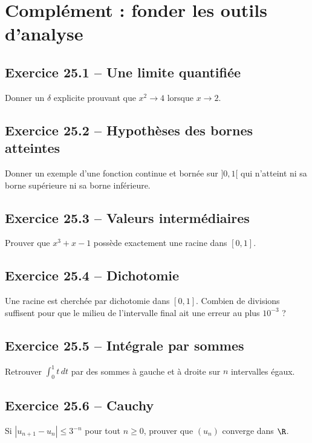 \chapter{Complément : fonder les outils d'analyse}
\section*{Exercice 25.1 -- Une limite quantifiée}
Donner un $\delta$ explicite prouvant que $x^2\to4$ lorsque $x\to2$.

\section*{Exercice 25.2 -- Hypothèses des bornes atteintes}
Donner un exemple d'une fonction continue et bornée sur $]0,1[$ qui n'atteint ni sa borne supérieure ni sa borne inférieure.

\section*{Exercice 25.3 -- Valeurs intermédiaires}
Prouver que $x^3+x-1$ possède exactement une racine dans $[0,1]$.

\section*{Exercice 25.4 -- Dichotomie}
Une racine est cherchée par dichotomie dans $[0,1]$. Combien de divisions suffisent pour que le milieu de l'intervalle final ait une erreur au plus $10^{-3}$ ?

\section*{Exercice 25.5 -- Intégrale par sommes}
Retrouver $\int_0^1t\,dt$ par des sommes à gauche et à droite sur $n$ intervalles égaux.

\section*{Exercice 25.6 -- Cauchy}
Si $|u_{n+1}-u_n|\le3^{-n}$ pour tout $n\ge0$, prouver que $(u_n)$ converge dans $\R$.
